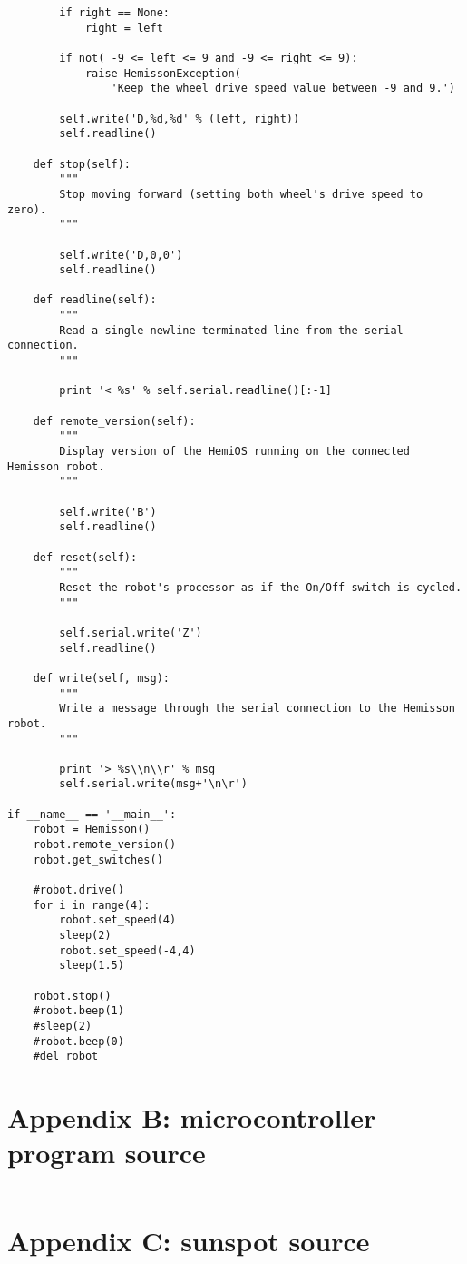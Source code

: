 \documentclass[a4paper, 12pt, titlepage]{article}
\begin{document}
\begin{verbatim}
        if right == None:
            right = left

        if not( -9 <= left <= 9 and -9 <= right <= 9):
            raise HemissonException(
                'Keep the wheel drive speed value between -9 and 9.')

        self.write('D,%d,%d' % (left, right))
        self.readline()

    def stop(self):
        """
        Stop moving forward (setting both wheel's drive speed to zero).
        """

        self.write('D,0,0')
        self.readline()

    def readline(self):
        """
        Read a single newline terminated line from the serial connection.
        """

        print '< %s' % self.serial.readline()[:-1]

    def remote_version(self):
        """
        Display version of the HemiOS running on the connected Hemisson robot.
        """

        self.write('B')
        self.readline()

    def reset(self):
        """
        Reset the robot's processor as if the On/Off switch is cycled.
        """

        self.serial.write('Z')
        self.readline()

    def write(self, msg):
        """
        Write a message through the serial connection to the Hemisson robot.
        """

        print '> %s\\n\\r' % msg
        self.serial.write(msg+'\n\r')

if __name__ == '__main__':
    robot = Hemisson()
    robot.remote_version()
    robot.get_switches()

    #robot.drive()
    for i in range(4):
        robot.set_speed(4)
        sleep(2)
        robot.set_speed(-4,4)
        sleep(1.5)

    robot.stop()
    #robot.beep(1)
    #sleep(2)
    #robot.beep(0)
    #del robot

\end{verbatim}


\section{Appendix B: microcontroller program source} %

\begin{verbatim}

\end{verbatim}


\section{Appendix C: sunspot source} %

\end{document}

